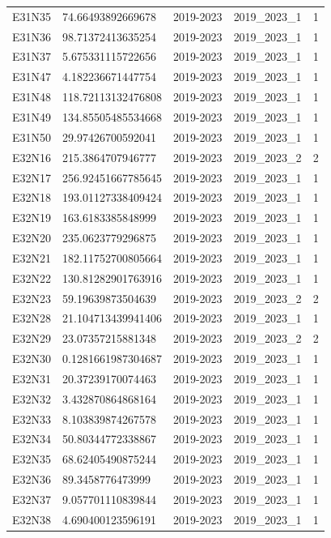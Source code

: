 \begin{landscape}
\begin{longtable}{lllll}
E31N35 & 74.66493892669678 & 2019-2023 & 2019\_2023\_1 & 1 \\
E31N36 & 98.71372413635254 & 2019-2023 & 2019\_2023\_1 & 1 \\
E31N37 & 5.675331115722656 & 2019-2023 & 2019\_2023\_1 & 1 \\
E31N47 & 4.182236671447754 & 2019-2023 & 2019\_2023\_1 & 1 \\
E31N48 & 118.72113132476808 & 2019-2023 & 2019\_2023\_1 & 1 \\
E31N49 & 134.85505485534668 & 2019-2023 & 2019\_2023\_1 & 1 \\
E31N50 & 29.97426700592041 & 2019-2023 & 2019\_2023\_1 & 1 \\
E32N16 & 215.3864707946777 & 2019-2023 & 2019\_2023\_2 & 2 \\
E32N17 & 256.92451667785645 & 2019-2023 & 2019\_2023\_1 & 1 \\
E32N18 & 193.01127338409424 & 2019-2023 & 2019\_2023\_1 & 1 \\
E32N19 & 163.6183385848999 & 2019-2023 & 2019\_2023\_1 & 1 \\
E32N20 & 235.0623779296875 & 2019-2023 & 2019\_2023\_1 & 1 \\
E32N21 & 182.11752700805664 & 2019-2023 & 2019\_2023\_1 & 1 \\
E32N22 & 130.81282901763916 & 2019-2023 & 2019\_2023\_1 & 1 \\
E32N23 & 59.19639873504639 & 2019-2023 & 2019\_2023\_2 & 2 \\
E32N28 & 21.104713439941406 & 2019-2023 & 2019\_2023\_1 & 1 \\
E32N29 & 23.07357215881348 & 2019-2023 & 2019\_2023\_2 & 2 \\
E32N30 & 0.1281661987304687 & 2019-2023 & 2019\_2023\_1 & 1 \\
E32N31 & 20.37239170074463 & 2019-2023 & 2019\_2023\_1 & 1 \\
E32N32 & 3.432870864868164 & 2019-2023 & 2019\_2023\_1 & 1 \\
E32N33 & 8.103839874267578 & 2019-2023 & 2019\_2023\_1 & 1 \\
E32N34 & 50.80344772338867 & 2019-2023 & 2019\_2023\_1 & 1 \\
E32N35 & 68.62405490875244 & 2019-2023 & 2019\_2023\_1 & 1 \\
E32N36 & 89.3458776473999 & 2019-2023 & 2019\_2023\_1 & 1 \\
E32N37 & 9.057701110839844 & 2019-2023 & 2019\_2023\_1 & 1 \\
E32N38 & 4.690400123596191 & 2019-2023 & 2019\_2023\_1 & 1 \\

\end{longtable}
\end{landscape}
